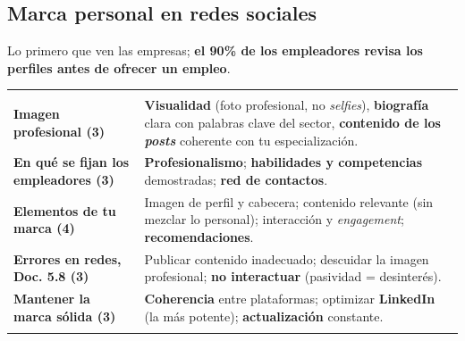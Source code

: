 \subsection{Marca personal en redes sociales}
Lo primero que ven las empresas; \textbf{el 90\% de los empleadores revisa los perfiles antes de ofrecer un empleo}.
\begin{tabla}
\begin{tabularx}{\textwidth}{@{}>{\bfseries}p{3.6cm} Y@{}}
 &  \\
\midrule
Imagen profesional (3) & \textbf{Visualidad} (foto profesional, no \emph{selfies}), \textbf{biografía} clara con palabras clave del sector, \textbf{contenido de los \emph{posts}} coherente con tu especialización. \\
En qué se fijan los empleadores (3) & \textbf{Profesionalismo}; \textbf{habilidades y competencias} demostradas; \textbf{red de contactos}. \\
Elementos de tu marca (4) & Imagen de perfil y cabecera; contenido relevante (sin mezclar lo personal); interacción y \emph{engagement}; \textbf{recomendaciones}. \\
Errores en redes, Doc. 5.8 (3) & Publicar contenido inadecuado; descuidar la imagen profesional; \textbf{no interactuar} (pasividad = desinterés). \\
Mantener la marca sólida (3) & \textbf{Coherencia} entre plataformas; optimizar \textbf{LinkedIn} (la más potente); \textbf{actualización} constante. \\
\bottomrule
\end{tabularx}
\end{tabla}

